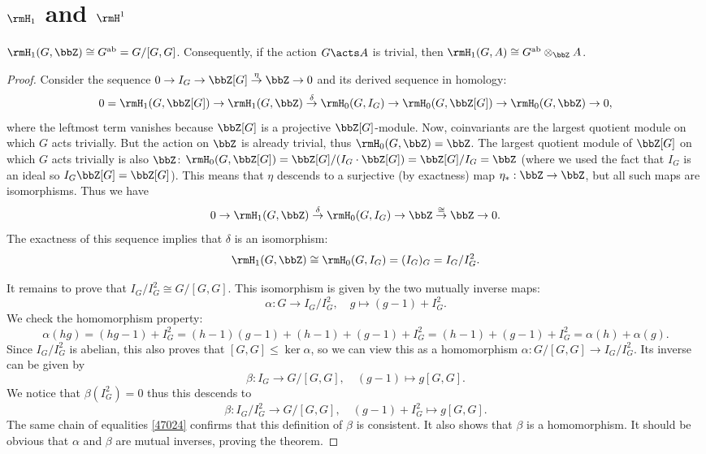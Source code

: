 \section{\texorpdfstring{$\rmH_1$}{H1} and \texorpdfstring{$\rmH^1$}{H1}}

\begin{thm}
    $\rmH_1(G,\bbZ)\cong G^{\mathrm{ab}}=G\slash [G,G]$. Consequently, if the action $G\acts A$ is trivial, then $\rmH_1(G,A)\cong G^{\mathrm{ab}}\otimes_\bbZ A$.
\end{thm}
\begin{proof}
 Consider the sequence $0\to I_G\to \bbZ[G]\overset{\eta}{\to}\bbZ\to 0$ and its derived sequence in homology:
 \[0=\rmH_1(G,\bbZ[G])\to \rmH_1(G,\bbZ)\overset{\delta}{\to}\rmH_0(G,I_G)\to \rmH_0(G,\bbZ[G])\to \rmH_0(G,\bbZ)\to 0,\]
 where the leftmost term vanishes because $\bbZ[G]$ is a projective $\bbZ[G]$-module. Now, coinvariants are the largest quotient module on which $G$ acts trivially. But the action on $\bbZ$ is already trivial, thus $\rmH_0(G,\bbZ)=\bbZ$. The largest quotient module of $\bbZ[G]$ on which $G$ acts trivially is also $\bbZ$: $\rmH_0(G,\bbZ[G])=\bbZ[G]\slash (I_G\cdot \bbZ[G])=\bbZ[G]\slash I_G=\bbZ$ (where we used the fact that $I_G$ is an ideal so $I_G\bbZ[G]=\bbZ[G]$). This means that $\eta$ descends to a surjective (by exactness) map $\eta_\ast:\bbZ\to \bbZ$, but all such maps are isomorphisms. Thus we have
 \[0\to \rmH_1(G,\bbZ)\overset{\delta}{\to}\rmH_0(G,I_G)\to \bbZ \overset{\cong}{\to}\bbZ\to 0.\]
 The exactness of this sequence implies that $\delta$ is an isomorphism:
 \[\rmH_1(G,\bbZ)\cong \rmH_0(G,I_G)=(I_G)_G=I_G\slash I_G^2.\]

 It remains to prove that $I_G\slash I_G^2\cong G\slash[G,G]$. This isomorphism is given by the two mutually inverse maps:
 \[\alpha:G\to I_G\slash I_G^2,\quad g\mapsto (g-1)+I_G^2.\]
 We check the homomorphism property:
 \[\alpha(hg)=(hg-1)+I_G^2=(h-1)(g-1)+(h-1)+(g-1)+I_G^2=(h-1)+(g-1)+I_G^2=\alpha(h)+\alpha(g).\label{47024}\]
 Since $I_G\slash I_G^2$ is abelian, this also proves that $[G,G]\leq \ker\alpha$, so we can view this as a homomorphism $\alpha:G\slash [G,G]\to I_G\slash I_G^2$. Its inverse can be given by
 \[\beta:I_G\to G\slash [G,G],\quad (g-1)\mapsto g[G,G].\]
 We notice that $\beta(I_G^2)=0$ thus this descends to 
\[\beta:I_G\slash I_G^2\to G\slash [G,G],\quad (g-1)+I_G^2\mapsto g[G,G].\]
The same chain of equalities  \eqref{47024} confirms that this definition of $\beta$ is consistent. It also shows that $\beta$ is a homomorphism. It should be obvious that $\alpha$ and $\beta$ are mutual inverses, proving the theorem.
\end{proof}

